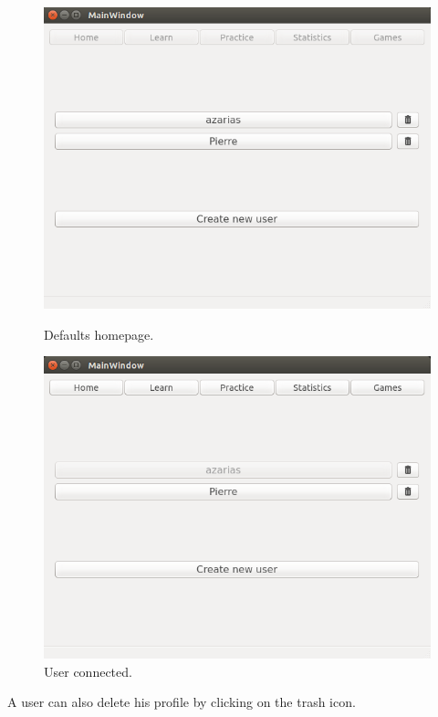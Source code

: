 \begin{figure}[H]
  \centering
  \begin{minipage}[b]{0.45\textwidth}
    \includegraphics[width=\textwidth]{images/homepage_logout.png}
    \caption{Defaults homepage.}
    \label{homepage-logout}
  \end{minipage}
  \hfill
  \begin{minipage}[b]{0.45\textwidth}
    \includegraphics[width=\textwidth]{images/homepage_login.png}
    \caption{User connected.}
    \label{homepage-login}
  \end{minipage}
\end{figure}
A user can also delete his profile by clicking on the trash icon. \\
